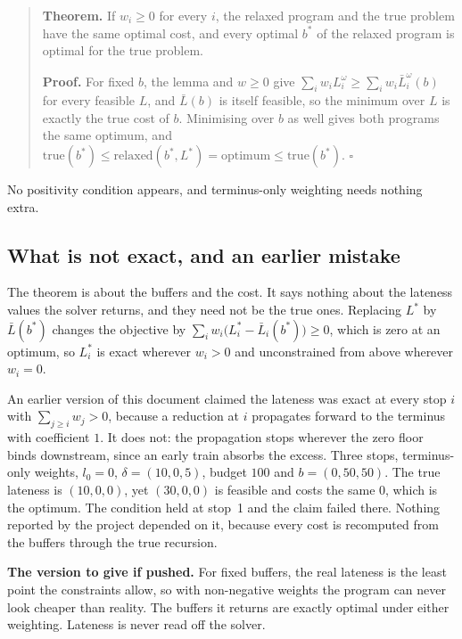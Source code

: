 \documentclass[11pt,a4paper]{article}
\begin{document}
\begin{quote}
\textbf{Theorem.} If $w_i \ge 0$ for every $i$, the relaxed program and the true problem have
the same optimal cost, and every optimal $b^\ast$ of the relaxed program is optimal for the
true problem.

\textbf{Proof.} For fixed $b$, the lemma and $w \ge 0$ give
$\sum_i w_i L_i^\omega \ge \sum_i w_i \bar L_i^\omega(b)$ for every feasible $L$, and
$\bar L(b)$ is itself feasible, so the minimum over $L$ is exactly the true cost of $b$.
Minimising over $b$ as well gives both programs the same optimum, and
$\mathrm{true}(b^\ast) \le \mathrm{relaxed}(b^\ast, L^\ast) = \mathrm{optimum}
\le \mathrm{true}(b^\ast)$. \hfill$\square$
\end{quote}

\noindent No positivity condition appears, and terminus-only weighting needs nothing extra.

\subsection*{What is not exact, and an earlier mistake}

The theorem is about the buffers and the cost. It says nothing about the lateness values the
solver returns, and they need not be the true ones. Replacing $L^\ast$ by $\bar L(b^\ast)$
changes the objective by $\sum_i w_i \bigl(L_i^\ast - \bar L_i(b^\ast)\bigr) \ge 0$, which is
zero at an optimum, so $L_i^\ast$ is exact wherever $w_i > 0$ and unconstrained from above
wherever $w_i = 0$.

An earlier version of this document claimed the lateness was exact at every stop $i$ with
$\sum_{j \ge i} w_j > 0$, because a reduction at $i$ propagates forward to the terminus with
coefficient $1$. It does not: the propagation stops wherever the zero floor binds downstream,
since an early train absorbs the excess. Three stops, terminus-only weights, $l_0 = 0$,
$\delta = (10, 0, 5)$, budget $100$ and $b = (0, 50, 50)$. The true lateness is $(10, 0, 0)$,
yet $(30, 0, 0)$ is feasible and costs the same $0$, which is the optimum. The condition held
at stop~1 and the claim failed there. Nothing reported by the project depended on it, because
every cost is recomputed from the buffers through the true recursion.

\begin{keybox}
\textbf{The version to give if pushed.} For fixed buffers, the real lateness is the least
point the constraints allow, so with non-negative weights the program can never look cheaper
than reality. The buffers it returns are exactly optimal under either weighting. Lateness is
never read off the solver.
\end{keybox}
\end{document}
